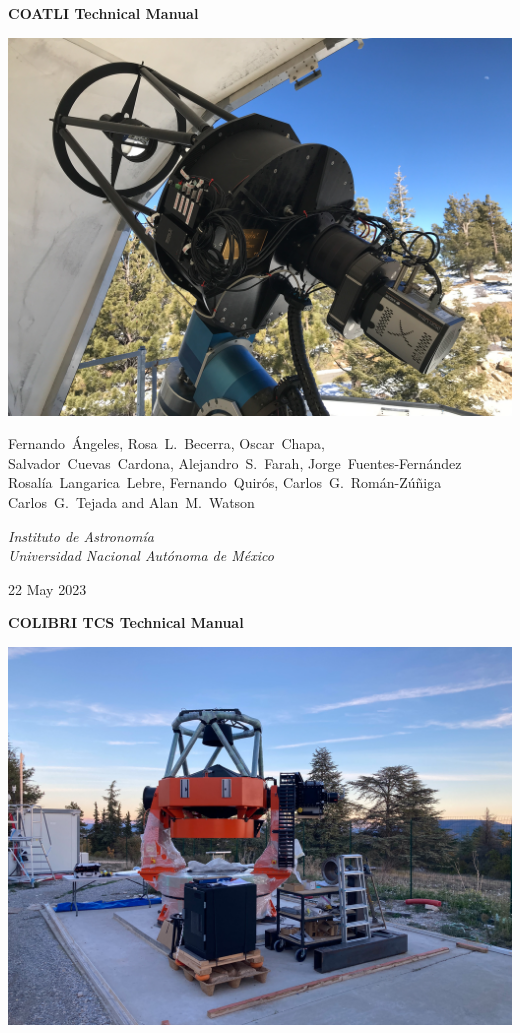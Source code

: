 \pagestyle{empty}

\begin{centering}

\ifcoatli
{
 \Large
 \bfseries 
 COATLI Technical Manual
 \par
}
\bigskip
\bigskip
\includegraphics[width=0.8\linewidth]{figures/frontmatter-coatli.jpg}

\bigskip
\bigskip
{
\baselineskip=10pt
 \large
 Fernando~Ángeles,
 Rosa~L.~Becerra,
 Oscar~Chapa,\\
 Salvador~Cuevas~Cardona,
 Alejandro~S.~Farah,
 Jorge~Fuentes-Fernández\\
 Rosalía~Langarica~Lebre,
 Fernando~Quirós,
 Carlos~G.~Román-Zúñiga\\
 Carlos~G.~Tejada
 and
 Alan~M.~Watson
 \par
}
\bigskip
{
 \large
 \itshape 
 Instituto de Astronomía\\
 Universidad Nacional Autónoma de México
 \par
}
\bigskip
{
 \large
 22 May 2023
}
\fi

\ifcolibri
\bigskip
\bigskip

{
 \Large
 \bfseries 
 COLIBRI TCS Technical Manual
 \par
}
\bigskip
\bigskip
\includegraphics[width=\linewidth]{figures/frontmatter-colibri.jpg}


\end{centering}
